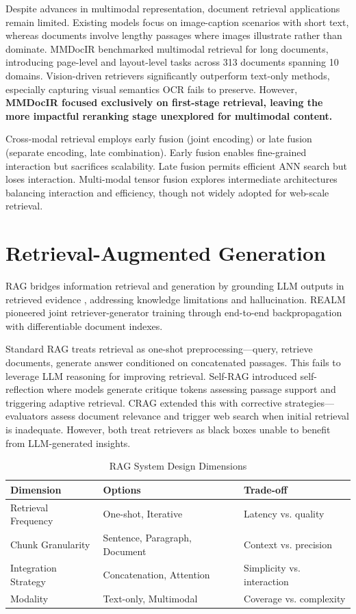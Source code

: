 Despite advances in multimodal representation, document retrieval applications remain limited. Existing models focus on image-caption scenarios with short text, whereas documents involve lengthy passages where images illustrate rather than dominate. MMDocIR \cite{dong2025mmdocir} benchmarked multimodal retrieval for long documents, introducing page-level and layout-level tasks across 313 documents spanning 10 domains. Vision-driven retrievers significantly outperform text-only methods, especially capturing visual semantics OCR fails to preserve. However, \textbf{MMDocIR focused exclusively on first-stage retrieval, leaving the more impactful reranking stage unexplored for multimodal content.}

Cross-modal retrieval employs early fusion (joint encoding) or late fusion (separate encoding, late combination). Early fusion enables fine-grained interaction but sacrifices scalability. Late fusion permits efficient ANN search but loses interaction. Multi-modal tensor fusion \cite{wang2019matching} explores intermediate architectures balancing interaction and efficiency, though not widely adopted for web-scale retrieval.

\section{Retrieval-Augmented Generation}

RAG bridges information retrieval and generation by grounding LLM outputs in retrieved evidence \cite{lewis2020retrieval}, addressing knowledge limitations and hallucination. REALM \cite{guu2020retrieval} pioneered joint retriever-generator training through end-to-end backpropagation with differentiable document indexes.

Standard RAG treats retrieval as one-shot preprocessing—query, retrieve documents, generate answer conditioned on concatenated passages. This fails to leverage LLM reasoning for improving retrieval. Self-RAG \cite{asai2024self} introduced self-reflection where models generate critique tokens assessing passage support and triggering adaptive retrieval. CRAG \cite{yan2024corrective} extended this with corrective strategies—evaluators assess document relevance and trigger web search when initial retrieval is inadequate. However, both treat retrievers as black boxes unable to benefit from LLM-generated insights.

\begin{table}[h]
\centering
\caption{RAG System Design Dimensions}
\label{tab:rag_design}
\small
\begin{tabular}{lll}
\toprule
\textbf{Dimension} & \textbf{Options} & \textbf{Trade-off} \\
\midrule
Retrieval Frequency & One-shot, Iterative & Latency vs. quality \\
Chunk Granularity & Sentence, Paragraph, Document & Context vs. precision \\
Integration Strategy & Concatenation, Attention & Simplicity vs. interaction \\
Modality & Text-only, Multimodal & Coverage vs. complexity \\
\bottomrule
\end{tabular}
\end{table}

